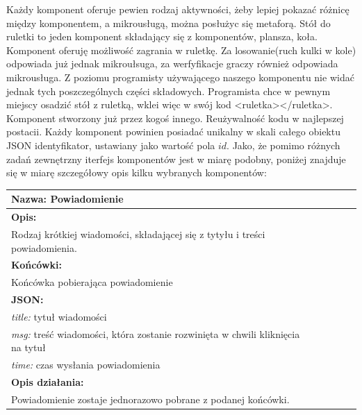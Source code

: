 \documentclass[licencjacka]{pracamgr}
\begin{document}
Każdy komponent oferuje pewien rodzaj aktywności, żeby lepiej pokazać różnicę między komponentem, a mikrousługą,
można posłużyc się metaforą. Stół do ruletki to jeden komponent składający się z komponentów, plansza, koła.
Komponent oferuję możliwość zagrania w ruletkę. Za losowanie(ruch kulki w kole) odpowiada już jednak mikroułsuga, za werfyfikacje
graczy również odpowiada mikrousługa. Z poziomu programisty używającego naszego komponentu nie widać jednak
tych poszczególnych części składowych. Programista chce w pewnym miejscy osadzić stół z ruletką, wklei więc w swój kod
<ruletka></ruletka>. Komponent stworzony już przez kogoś innego. Reużywalność kodu w najlepszej postacii.
Każdy komponent powinien posiadać unikalny w skali całego obiektu JSON identyfikator, ustawiany jako wartość pola $id$.
Jako, że pomimo różnych zadań zewnętrzny iterfejs komponentów jest w miarę podobny, 
poniżej znajduje się w miarę szczegółowy opis kilku wybranych komponentów: \\

\begin{tabularx}{\linewidth}{|l|l|c|X|l|}\hline
\textbf{Nazwa:}
Powiadomienie
\\\hline
\textbf{Opis:}\\

Rodzaj krótkiej wiadomości, składającej się z tytyłu i treści powiadomienia.\\\hline
\textbf{Końcówki:}\\
Końcówka pobierająca powiadomienie\\\hline
\textbf{JSON:}\\
\textit{title:} tytuł wiadomości\\
\textit{msg:} treść wiadomości, która zostanie rozwinięta w chwili kliknięcia na tytuł\\
\textit{time:} czas wysłania powiadomienia\\\hline
\textbf{Opis działania:}\\
Powiadomienie zostaje jednorazowo pobrane z podanej końcówki.\\\hline
\end{tabularx}
\end{document}
